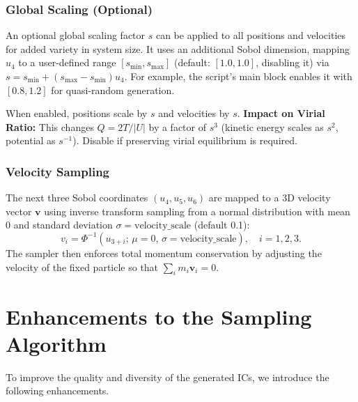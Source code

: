 \documentclass{article}
\begin{document}
\subsubsection*{Global Scaling (Optional)}
An optional global scaling factor $s$ can be applied to all positions and velocities for added variety in system size. It uses an additional Sobol dimension, mapping $u_4$ to a user-defined range $[s_{\min}, s_{\max}]$ (default: $[1.0, 1.0]$, disabling it) via $s = s_{\min} + (s_{\max} - s_{\min})u_4$. For example, the script's main block enables it with $[0.8, 1.2]$ for quasi-random generation.

When enabled, positions scale by $s$ and velocities by $s$. \textbf{Impact on Virial Ratio:} This changes $Q = 2T / |U|$ by a factor of $s^3$ (kinetic energy scales as $s^2$, potential as $s^{-1}$). Disable if preserving virial equilibrium is required.


\subsubsection*{Velocity Sampling}
The next three Sobol coordinates $(u_4, u_5, u_6)$ are mapped to a 3D velocity vector $\mathbf{v}$ using inverse transform sampling from a normal distribution with mean 0 and standard deviation $\sigma = \text{velocity\_scale}$ (default 0.1):
\[
  v_i = \Phi^{-1}(u_{3+i};\,\mu=0,\,\sigma=\text{velocity\_scale}),\quad i=1,2,3.
\]
The sampler then enforces total momentum conservation by adjusting the velocity of the fixed particle so that $\sum_i m_i \mathbf{v}_i = 0$.

\section{Enhancements to the Sampling Algorithm}
To improve the quality and diversity of the generated ICs, we introduce the following enhancements.
\end{document}
